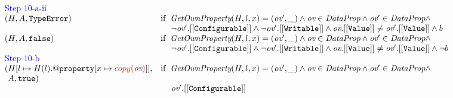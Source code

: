 \[\begin{array}{l@{}c@{}l}
{\begin{array}{ll}
\multicolumn{2}{l}{\mbox{\inblue Step 10-a-ii}}\\
(H,A,\te)
&\ifc{\hf{GetOwnProperty}(H,l,x) = (\emph{ov}', \_) \wedge
\emph{ov} \in \emph{DataProp} \wedge
\emph{ov}' \in \emph{DataProp} \wedge}\\
&\mbox{\phantom{if \ }$
\neg \emph{ov}'.{\tt[[Configurable]]} \wedge \neg\emph{ov}'.{\tt[[Writable]]} \wedge
\emph{ov}.{\tt[[Value]]} \not= \emph{ov}'.{\tt[[Value]]} \wedge b$}\\

(H,A,\false)
&\ifc{\hf{GetOwnProperty}(H,l,x) = (\emph{ov}', \_) \wedge
\emph{ov} \in \emph{DataProp} \wedge
\emph{ov}' \in \emph{DataProp} \wedge}\\
&\mbox{\phantom{if \ }$\neg \emph{ov}'.{\tt[[Configurable]]} \wedge \neg\emph{ov}'.{\tt[[Writable]]} \wedge
\emph{ov}.{\tt[[Value]]} \not= \emph{ov}'.{\tt[[Value]]} \wedge \neg b$}\\

\multicolumn{2}{l}{\mbox{\inblue Step 10-b}}\\
(H[l\mapsto H(l).{\tt@property}[x\mapsto{\inred copy(}\emph{ov}{\inred)}]], 
&\ifc{\hf{GetOwnProperty}(H,l,x) = (\emph{ov}', \_) \wedge
\emph{ov} \in \emph{DataProp} \wedge
\emph{ov}' \in \emph{DataProp} \wedge}\\
\phantom{(}A,\true)\\
&\mbox{\phantom{if \ }$\emph{ov}'.{\tt[[Configurable]]}$}\\


\end{array}}
\end{array}\]
